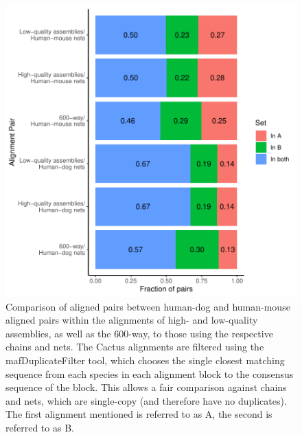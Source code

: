 \documentclass{article}
\begin{document}
\begin{figure}
    \centering
    \includegraphics[width=\textwidth]{cactus_alignments_vs_cactus_alignments_vs_nets.pdf}
    \caption{
    Comparison of aligned pairs between human-dog and human-mouse aligned pairs within the alignments of high- and low-quality assemblies, as well as the 600-way, to those using the respective chains and nets. The Cactus alignments are filtered using the mafDuplicateFilter tool, which chooses the single closest matching sequence from each species in each alignment block to the consensus sequence of the block. This allows a fair comparison against chains and nets, which are single-copy (and therefore have no duplicates). The first alignment mentioned is referred to as A, the second is referred to as B.}
    \label{fig:comparisonToChainsAndNets} 
\end{figure}

\end{document}

